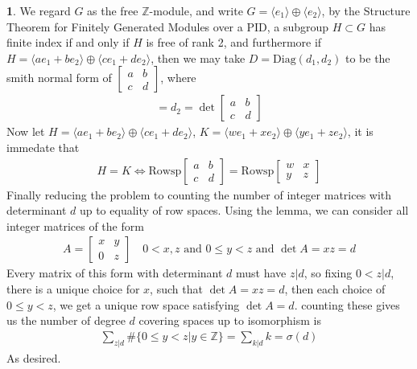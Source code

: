 \documentclass[10.5pt]{article}
\theoremstyle{definition}
\newtheorem{pb}{}
\newcommand{\set}[1]{\{#1\}}
\newcommand{\gen}[1]{\langle #1 \rangle}
\newcommand{\tand}{\text{ and }}
\begin{document}
\begin{pb}
        We regard \(G\) as the free \(\mathbb{Z}\)-module, and write \(G = \gen{e_1} \oplus \gen{e_2}\), by the Structure Theorem for Finitely Generated Modules over a PID, a subgroup \(H \subset G\) has finite index if and only if \(H\) is free of rank 2, and furthermore if \(H = \gen{a e_1 + be_2} \oplus \gen{ce_1 + de_2}\), then we may take \(D = \text{Diag}(d_1,d_2)\) to be the smith normal form of
        \(\begin{bmatrix}a & b\\ c & d \end{bmatrix}\), where
        \begin{align*}
            [G:H] = d_2 = \det \begin{bmatrix}a & b\\ c & d \end{bmatrix}
        \end{align*}
        Now let \(H = \gen{a e_1 + be_2} \oplus \gen{ce_1 + de_2}\), \(K = \gen{we_1 + xe_2} \oplus \gen{ye_1 + ze_2}\), it is immedate that
        \begin{align*}
            H = K \iff \text{Rowsp}\begin{bmatrix}a & b\\ c & d \end{bmatrix} = \text{Rowsp}\begin{bmatrix}w & x\\ y & z \end{bmatrix}
        \end{align*}
        Finally reducing the problem to counting the number of integer matrices with determinant \(d\) up to equality of row spaces. Using the lemma, we can consider all integer matrices of the form
        \begin{align*}
            A = \begin{bmatrix} x & y \\ 0 & z \end{bmatrix} \quad 0 < x, z \tand 0 \leq y < z \tand \det A = xz = d
        \end{align*}
        Every matrix of this form with determinant \(d\) must have \(z \vert d\), so fixing \(0 < z \vert d\), there is a unique choice for \(x\), such that \(\det A = xz = d\), then each choice of \(0 \leq y < z\), we get a unique row space satisfying \(\det A = d\).
        counting these gives us the number of degree \(d\) covering spaces up to isomorphism is
        \begin{align*}
            \sum_{z \vert d} \# \set{0 \leq y < z \vert y \in \mathbb{Z}} = \sum_{k \vert d} k = \sigma(d)
        \end{align*}
        As desired.
    \end{pb}
\end{document}
